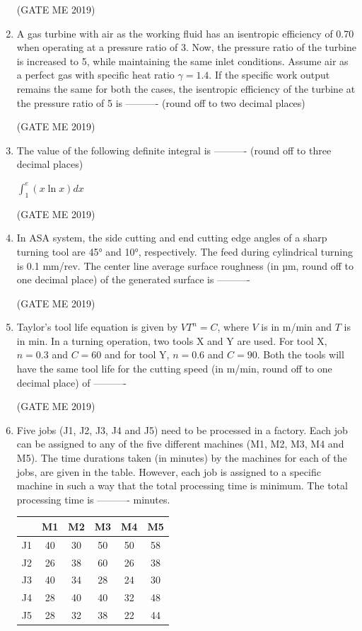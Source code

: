 \documentclass[journal]{IEEEtran}
\begin{document}
\begin{enumerate}
\hfill (GATE ME 2019)

\item A gas turbine with air as the working fluid has an isentropic efficiency of 0.70 when operating at a pressure ratio of 3. Now, the pressure ratio of the turbine is increased to 5, while maintaining the same inlet conditions. Assume air as a perfect gas with specific heat ratio $\gamma = 1.4$. If the specific work output remains the same for both the cases, the isentropic efficiency of the turbine at the pressure ratio of 5 is ---------- (round off to two decimal places)

\hfill (GATE ME 2019)

\item The value of the following definite integral is ---------- (round off to three decimal places)

\begin{center}
$\int_{1}^{e} (x \ln x) dx$
\end{center}

\hfill (GATE ME 2019)

\item In ASA system, the side cutting and end cutting edge angles of a sharp turning tool are 45° and 10°, respectively. The feed during cylindrical turning is 0.1 mm/rev. The center line average surface roughness (in µm, round off to one decimal place) of the generated surface is ----------

\hfill (GATE ME 2019)

\item Taylor's tool life equation is given by $ VT^n = C $, where $ V $ is in m/min and $ T $ is in min. In a turning operation, two tools X and Y are used. For tool X, $ n = 0.3 $ and $ C = 60 $ and for tool Y, $ n = 0.6 $ and $ C = 90 $. Both the tools will have the same tool life for the cutting speed (in m/min, round off to one decimal place) of ----------

\hfill (GATE ME 2019)

\item Five jobs (J1, J2, J3, J4 and J5) need to be processed in a factory. Each job can be assigned to any of the five different machines (M1, M2, M3, M4 and M5). The time durations taken (in minutes) by the machines for each of the jobs, are given in the table. However, each job is assigned to a specific machine in such a way that the total processing time is minimum. The total processing time is ---------- minutes.

\begin{tabular}{|c|c|c|c|c|c|}
\hline
 & M1 & M2 & M3 & M4 & M5 \\
\hline
J1 & 40 & 30 & 50 & 50 & 58 \\
\hline
J2 & 26 & 38 & 60 & 26 & 38 \\
\hline
J3 & 40 & 34 & 28 & 24 & 30 \\
\hline
J4 & 28 & 40 & 40 & 32 & 48 \\
\hline
J5 & 28 & 32 & 38 & 22 & 44 \\
\hline
\end{tabular}


\end{enumerate}
\end{document}
